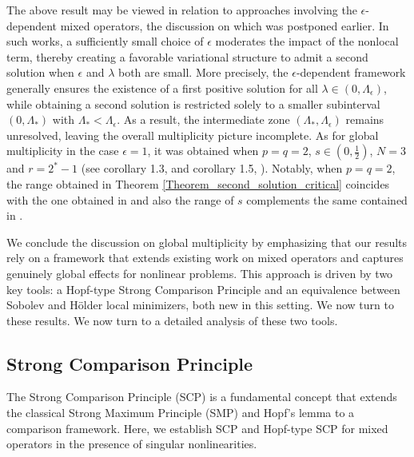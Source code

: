 \documentclass[reqno,oneside]{amsart}
\theoremstyle{definition}
\theoremstyle{remark}
\numberwithin{equation}{section}
\newcommand{\la} {\lambda}
\begin{document}
The above result may be viewed in relation to approaches involving the $\epsilon$-dependent mixed operators, the discussion on which was postponed earlier. In such works, a sufficiently small choice of $\epsilon$ moderates the impact of the nonlocal term, thereby creating a favorable variational structure to admit a second solution when $\epsilon$ and $\lambda$ both are small. More precisely, the $\epsilon$-dependent framework generally ensures the existence of a first positive solution for all $\la\in (0,\Lambda_\epsilon)$, while obtaining a second solution is restricted solely to a smaller subinterval $(0,\Lambda_*)$ with $\Lambda_* < \Lambda_{\epsilon}$. As a result, the intermediate zone $(\Lambda_*, \Lambda_\epsilon)$ remains unresolved, leaving the overall multiplicity picture incomplete. As for global multiplicity in the case $\epsilon=1$, it was obtained when $p=q=2$, $s\in \left(0, \frac{1}{2}\right)$, $N=3$ and $r=2^* -1$ (see corollary 1.3, \cite{biagi2024critical} and corollary 1.5, \cite{biagi2025convexconcave}). Notably, when $p=q=2$, the range obtained in Theorem \ref{Theorem_second_solution_critical} coincides with the one obtained in \cite{biagi2024critical} and also the range of $s$ complements the same contained in \cite{dhanya2025multiplicityresultsmixedlocal}.

We conclude the discussion on global multiplicity by emphasizing that our results rely on a framework that extends existing work on mixed operators and captures genuinely global effects for nonlinear problems. This approach is driven by two key tools: a Hopf-type Strong Comparison Principle and an equivalence between Sobolev and H\"older local minimizers, both new in this setting. We now turn to these results. We now turn to a detailed analysis of these two tools.

\subsection{Strong Comparison Principle}

The Strong Comparison Principle (SCP) is a fundamental concept that extends the classical Strong Maximum Principle (SMP) and Hopf's lemma to a comparison framework. Here, we establish SCP and Hopf-type SCP for mixed operators in the presence of singular nonlinearities.
\end{document}
